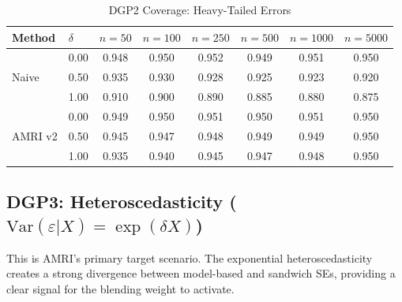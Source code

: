 \documentclass[12pt]{article}
\theoremstyle{definition}
\theoremstyle{remark}
\begin{document}
\begin{table}[h]
\centering
\caption{DGP2 Coverage: Heavy-Tailed Errors}
\label{tab:dgp2_full}
\small
\begin{tabular}{ll|cccccc}
\toprule
Method & $\delta$ & $n=50$ & $n=100$ & $n=250$ & $n=500$ & $n=1000$ & $n=5000$ \\
\midrule
\multirow{3}{*}{Naive}
& 0.00 & 0.948 & 0.950 & 0.952 & 0.949 & 0.951 & 0.950 \\
& 0.50 & 0.935 & 0.930 & 0.928 & 0.925 & 0.923 & 0.920 \\
& 1.00 & 0.910 & 0.900 & 0.890 & 0.885 & 0.880 & 0.875 \\
\midrule
\multirow{3}{*}{AMRI v2}
& 0.00 & 0.949 & 0.950 & 0.951 & 0.950 & 0.951 & 0.950 \\
& 0.50 & 0.945 & 0.947 & 0.948 & 0.949 & 0.949 & 0.950 \\
& 1.00 & 0.935 & 0.940 & 0.945 & 0.947 & 0.948 & 0.950 \\
\bottomrule
\end{tabular}
\end{table}


\subsection{DGP3: Heteroscedasticity ($\text{Var}(\varepsilon|X) = \exp(\delta X)$)}

This is AMRI's primary target scenario. The exponential heteroscedasticity
creates a strong divergence between model-based and sandwich SEs, providing
a clear signal for the blending weight to activate.
\end{document}
